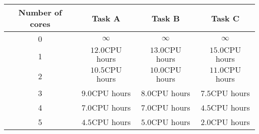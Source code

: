 \documentclass[10pt]{article}
\begin{document}
\begin{center}
\begin{tabular}{|c||c|c|c|}
\hline
Number of cores & Task A & Task B & Task C \\
\hline\hline
0 & $\infty$ & $\infty$ & $\infty$ \\
\hline
1 & $12.0 \mathrm{CPU}$ hours & $13.0 \mathrm{CPU}$ hours & $15.0 \mathrm{CPU}$ hours \\
\hline
2 & $10.5 \mathrm{CPU}$ hours & $10.0 \mathrm{CPU}$ hours & $11.0 \mathrm{CPU}$ hours \\
\hline
3 & $9.0 \mathrm{CPU}$ hours & $8.0 \mathrm{CPU}$ hours & $7.5 \mathrm{CPU}$ hours \\
\hline
4 & $7.0 \mathrm{CPU}$ hours & $7.0 \mathrm{CPU}$ hours & $4.5 \mathrm{CPU}$ hours \\
\hline
5 & $4.5 \mathrm{CPU}$ hours & $5.0 \mathrm{CPU}$ hours & $2.0 \mathrm{CPU}$ hours \\
\hline
\end{tabular}
\end{center}
\end{document}
